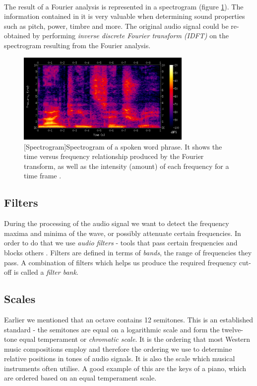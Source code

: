 \paragraph{}
The result of a Fourier analysis is represented in a spectrogram (figure
\ref{fig:spectrogram}). The information contained in it is very valuable when
determining sound properties such as pitch, power, timbre and more. The original
audio signal could be re-obtained by performing \textit{inverse discrete Fourier
transform (IDFT)} on the spectrogram resulting from the Fourier analysis.

\begin{figure}[H]
    \centering
    \includegraphics[width=0.75\textwidth]{BackgroundTheory/spectrogram.png}
    [Spectrogram]{Spectrogram of a spoken word phrase. It shows the time versus frequency relationship produced by the Fourier transform, as well as the intensity (amount) of each frequency for a time frame \cite{wiki:spectrogram}.}
    \label{fig:spectrogram}
\end{figure}

\subsection{Filters}
\label{subsec:filters}
During the processing of the audio signal we want to detect the frequency maxima
and minima of the wave, or possibly attenuate certain frequencies. In order to
do that we use \textit{audio filters} - tools that pass certain frequencies and
blocks others \cite{filters}. Filters are defined in terms of \textit{bands},
the range of frequencies they pass. A combination of filters which helps us
produce the required frequency cut-off is called a \textit{filter bank}.

\subsection{Scales}
\label{subsec:scales}
Earlier we mentioned that an octave contains 12 semitones. This is an
established standard - the semitones are equal on a logarithmic scale and form
the twelve-tone equal temperament or \textit{chromatic scale}. It is the
ordering that most Western music compositions employ and therefore the ordering
we use to determine relative positions in tones of audio signals. It is also the
scale which musical instruments often utilise. A good example of this are the
keys of a piano, which are ordered based on an equal temperament scale.

